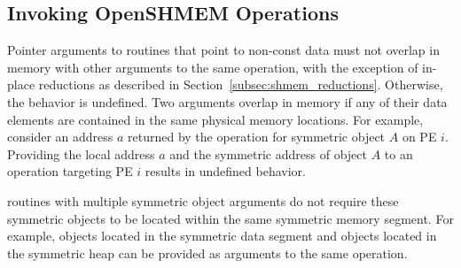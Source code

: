 
\subsection{Invoking OpenSHMEM Operations}

Pointer arguments to \openshmem routines that point to non-const data must not
overlap in memory with other arguments to the same \openshmem operation, with
the exception of in-place reductions as described in Section~\ref{subsec:shmem_reductions}.
Otherwise, the behavior is undefined.  Two arguments overlap in memory if any
of their data elements are contained in the same physical memory locations.
For example, consider an address $a$ returned by the  operation
for symmetric object $A$ on \ac{PE} $i$.  Providing the local address $a$ and
the symmetric address of object $A$ to an \openshmem operation targeting
\ac{PE} $i$ results in undefined behavior.

\openshmem routines with multiple symmetric object arguments do not require
these symmetric objects to be located within the same symmetric memory segment.
For example, objects located in the symmetric data segment and objects located
in the symmetric heap can be provided as arguments to the same \openshmem
operation.

